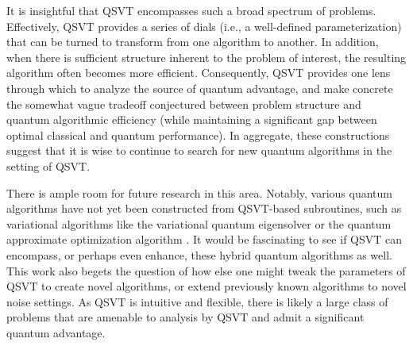 \documentclass[aps,pra,showpacs,notitlepage,twocolumn,superscriptaddress,nofootinbib]{revtex4-1}
\begin{document}
    It is insightful that QSVT encompasses such a broad spectrum of problems. Effectively, QSVT provides a series of dials (i.e., a well-defined parameterization) that can be turned to transform from one algorithm to another. In addition, when there is sufficient structure inherent to the problem of interest, the resulting algorithm often becomes more efficient. Consequently, QSVT provides one lens through which to analyze the source of quantum advantage, and make concrete the somewhat vague tradeoff conjectured between problem structure and quantum algorithmic efficiency (while maintaining a significant gap between optimal classical and quantum performance). In aggregate, these constructions suggest that it is wise to continue to search for new quantum algorithms in the setting of QSVT.
    
    There is ample room for future research in this area. Notably, various quantum algorithms have not yet been constructed from QSVT-based subroutines, such as variational algorithms like the variational quantum eigensolver \cite{peruzzo2014variational} or the quantum approximate optimization algorithm \cite{farhi2014quantum}. It would be fascinating to see if QSVT can encompass, or perhaps even enhance, these hybrid quantum algorithms as well. This work also begets the question of how else one might tweak the parameters of QSVT to create novel algorithms, or extend previously known algorithms to novel noise settings. As QSVT is intuitive and flexible, there is likely a large class of problems that are amenable to analysis by QSVT and admit a significant quantum advantage. 
    
\end{document}
